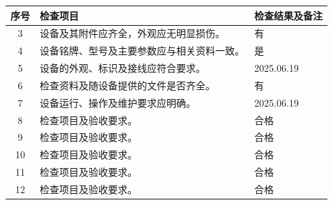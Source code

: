 \documentclass[UTF8,10pt,a4paper,fontset=fandol]{ctexart}
\newcommand{\fieldvalue}[1]{#1}
\newcommand{\handwritten}[1]{#1}
\begin{document}
\begin{tabularx}{\textwidth}{|c|X|X|}
\hline
序号 & 检查项目 & 检查结果及备注 \\
\hline
3 & 
设备及其附件应齐全，外观应无明显损伤。 &
\fieldvalue{\handwritten{有}} \\
\hline
4 &
设备铭牌、型号及主要参数应与相关资料一致。 &
\fieldvalue{\handwritten{是}} \\
\hline
5 &
设备的外观、标识及接线应符合要求。 &
\fieldvalue{\handwritten{2025.06.19}} \\
\hline
6 &
检查资料及随设备提供的文件是否齐全。 &
\fieldvalue{\handwritten{有}} \\
\hline
7 &
设备运行、操作及维护要求应明确。 &
\fieldvalue{\handwritten{2025.06.19}} \\
\hline
8 &
检查项目及验收要求。 &
\fieldvalue{\handwritten{合格}} \\
\hline
9 &
检查项目及验收要求。 &
\fieldvalue{\handwritten{合格}} \\
\hline
10 &
检查项目及验收要求。 &
\fieldvalue{\handwritten{合格}} \\
\hline
11 &
检查项目及验收要求。 &
\fieldvalue{\handwritten{合格}} \\
\hline
12 &
检查项目及验收要求。 &
\fieldvalue{\handwritten{合格}} \\
\hline
\end{tabularx}

\vspace{1em}
\end{document}
